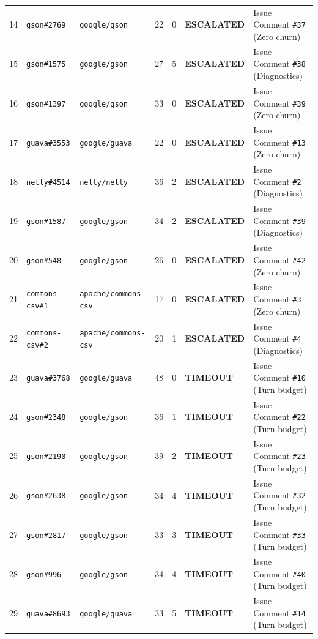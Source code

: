 \documentclass[12pt,a4paper]{report}
\begin{document}
\begin{table}[htbp]
\begin{tabularx}{\textwidth}{r l l c c l X}
14 & \texttt{gson\#2769} & \texttt{google/gson} & 22 & 0 & \textbf{ESCALATED} & Issue Comment \texttt{\#37} (Zero churn) \\
15 & \texttt{gson\#1575} & \texttt{google/gson} & 27 & 5 & \textbf{ESCALATED} & Issue Comment \texttt{\#38} (Diagnostics) \\
16 & \texttt{gson\#1397} & \texttt{google/gson} & 33 & 0 & \textbf{ESCALATED} & Issue Comment \texttt{\#39} (Zero churn) \\
17 & \texttt{guava\#3553} & \texttt{google/guava} & 22 & 0 & \textbf{ESCALATED} & Issue Comment \texttt{\#13} (Zero churn) \\
18 & \texttt{netty\#4514} & \texttt{netty/netty} & 36 & 2 & \textbf{ESCALATED} & Issue Comment \texttt{\#2} (Diagnostics) \\
19 & \texttt{gson\#1587} & \texttt{google/gson} & 34 & 2 & \textbf{ESCALATED} & Issue Comment \texttt{\#39} (Diagnostics) \\
20 & \texttt{gson\#548} & \texttt{google/gson} & 26 & 0 & \textbf{ESCALATED} & Issue Comment \texttt{\#42} (Zero churn) \\
21 & \texttt{commons-csv\#1} & \texttt{apache/commons-csv} & 17 & 0 & \textbf{ESCALATED} & Issue Comment \texttt{\#3} (Zero churn) \\
22 & \texttt{commons-csv\#2} & \texttt{apache/commons-csv} & 20 & 1 & \textbf{ESCALATED} & Issue Comment \texttt{\#4} (Diagnostics) \\
\midrule
23 & \texttt{guava\#3768} & \texttt{google/guava} & 48 & 0 & \textbf{TIMEOUT} & Issue Comment \texttt{\#10} (Turn budget) \\
24 & \texttt{gson\#2348} & \texttt{google/gson} & 36 & 1 & \textbf{TIMEOUT} & Issue Comment \texttt{\#22} (Turn budget) \\
25 & \texttt{gson\#2190} & \texttt{google/gson} & 39 & 2 & \textbf{TIMEOUT} & Issue Comment \texttt{\#23} (Turn budget) \\
26 & \texttt{gson\#2638} & \texttt{google/gson} & 34 & 4 & \textbf{TIMEOUT} & Issue Comment \texttt{\#32} (Turn budget) \\
27 & \texttt{gson\#2817} & \texttt{google/gson} & 33 & 3 & \textbf{TIMEOUT} & Issue Comment \texttt{\#33} (Turn budget) \\
28 & \texttt{gson\#996} & \texttt{google/gson} & 34 & 4 & \textbf{TIMEOUT} & Issue Comment \texttt{\#40} (Turn budget) \\
29 & \texttt{guava\#8693} & \texttt{google/guava} & 33 & 5 & \textbf{TIMEOUT} & Issue Comment \texttt{\#14} (Turn budget) \\

\end{tabularx}
\end{table}
\end{document}
